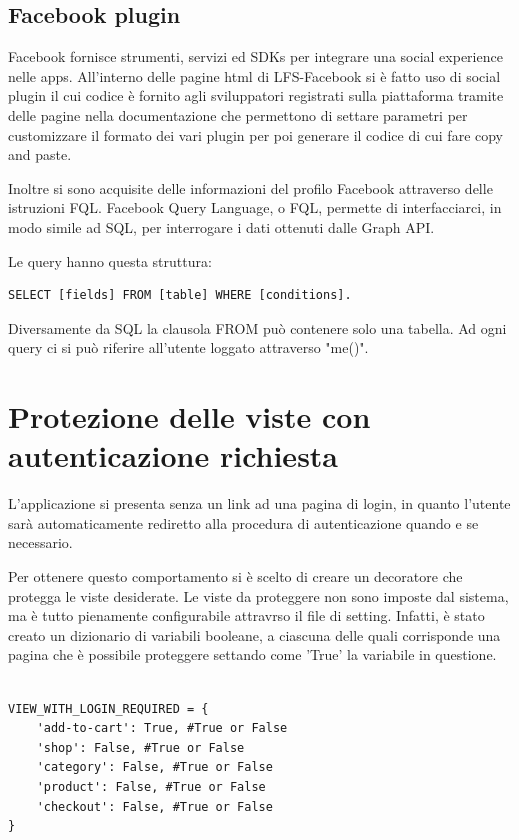 \subsection{Facebook plugin}
Facebook fornisce strumenti, servizi ed SDKs per integrare una social experience nelle apps. All'interno delle pagine html di LFS-Facebook si è fatto uso di social plugin il cui codice è fornito agli sviluppatori registrati sulla piattaforma tramite delle pagine nella documentazione che permettono di settare parametri per customizzare il formato dei vari plugin per poi generare il codice di cui fare copy and paste.

Inoltre si sono acquisite delle informazioni del profilo Facebook attraverso delle istruzioni FQL. Facebook Query Language, o FQL, permette di interfacciarci, in modo simile ad SQL, per interrogare i dati ottenuti dalle Graph API.

Le query hanno questa struttura: 
\begin{lstlisting}
SELECT [fields] FROM [table] WHERE [conditions]. 
\end{lstlisting}
Diversamente da SQL la clausola FROM può contenere solo una tabella. Ad ogni query ci si può riferire all'utente loggato attraverso "me()". 

\section{Protezione delle viste con autenticazione richiesta}
L'applicazione si presenta senza un link ad una pagina di login, in quanto l'utente sarà automaticamente rediretto alla procedura di autenticazione quando e se necessario. 

Per ottenere questo comportamento si è scelto di creare un decoratore che protegga le viste desiderate.
Le viste da proteggere non sono imposte dal sistema, ma è tutto pienamente configurabile attravrso il file di setting. Infatti, è stato creato un dizionario di variabili booleane, a ciascuna delle quali corrisponde una pagina che è possibile proteggere settando come 'True' la variabile in questione.


\begin{lstlisting}

VIEW_WITH_LOGIN_REQUIRED = {
    'add-to-cart': True, #True or False
    'shop': False, #True or False
    'category': False, #True or False
    'product': False, #True or False
    'checkout': False, #True or False
}

\end{lstlisting}


